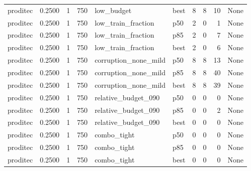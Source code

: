 \begin{tabular}{lrrrllrrrl}
proditec &    0.2500 &    1 &    750 &           low\_budget &   best &               8 &          8 &      10 &                                               None \\
proditec &    0.2500 &    1 &    750 &   low\_train\_fraction &    p50 &               2 &          0 &       1 &                                               None \\
proditec &    0.2500 &    1 &    750 &   low\_train\_fraction &    p85 &               2 &          0 &       7 &                                               None \\
proditec &    0.2500 &    1 &    750 &   low\_train\_fraction &   best &               2 &          0 &       6 &                                               None \\
proditec &    0.2500 &    1 &    750 & corruption\_none\_mild &    p50 &               8 &          8 &      13 &                                               None \\
proditec &    0.2500 &    1 &    750 & corruption\_none\_mild &    p85 &               8 &          8 &      40 &                                               None \\
proditec &    0.2500 &    1 &    750 & corruption\_none\_mild &   best &               8 &          8 &      39 &                                               None \\
proditec &    0.2500 &    1 &    750 &  relative\_budget\_090 &    p50 &               0 &          0 &       0 &                                               None \\
proditec &    0.2500 &    1 &    750 &  relative\_budget\_090 &    p85 &               0 &          0 &       2 &                                               None \\
proditec &    0.2500 &    1 &    750 &  relative\_budget\_090 &   best &               0 &          0 &       0 &                                               None \\
proditec &    0.2500 &    1 &    750 &          combo\_tight &    p50 &               0 &          0 &       0 &                                               None \\
proditec &    0.2500 &    1 &    750 &          combo\_tight &    p85 &               0 &          0 &       0 &                                               None \\
proditec &    0.2500 &    1 &    750 &          combo\_tight &   best &               0 &          0 &       0 &                                               None \\

\end{tabular}
